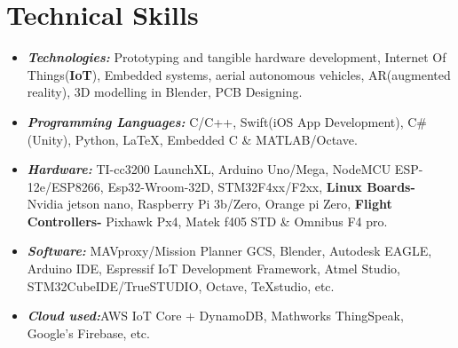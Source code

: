 \documentclass[10pt]{report}
\begin{document}
\section*{\color{BlueViolet}\faSellsy\hspace{1pt} Technical Skills} %
\begin{itemize}
\item \textbf{\emph{Technologies:}} Prototyping and tangible hardware development, Internet Of Things(\textbf{IoT}), Embedded systems, aerial autonomous vehicles, AR(augmented reality), 3D modelling in Blender, PCB Designing. 
\item\textbf{\emph{Programming Languages:}} C/C++, Swift(iOS App Development), C#(Unity), Python, \LaTeX, Embedded C   \& MATLAB/Octave.
\item\textbf{\emph{Hardware:}} TI-cc3200 LaunchXL, Arduino Uno/Mega, NodeMCU ESP-12e/ESP8266, Esp32-Wroom-32D, STM32F4xx/F2xx,\textbf{ Linux Boards-} Nvidia jetson nano, Raspberry Pi 3b/Zero, Orange pi Zero,\textbf{ Flight Controllers-} Pixhawk Px4, Matek f405 STD \& Omnibus F4 pro.
\item\textbf{\emph{Software:}} MAVproxy/Mission Planner GCS, Blender, Autodesk EAGLE, Arduino IDE, Espressif IoT Development Framework, Atmel Studio, STM32CubeIDE/TrueSTUDIO, Octave, TeXstudio, etc.
\item\textbf{\emph{Cloud used:}}AWS IoT Core + DynamoDB, Mathworks ThingSpeak, Google's Firebase, etc.
\end{itemize}
\end{document}
